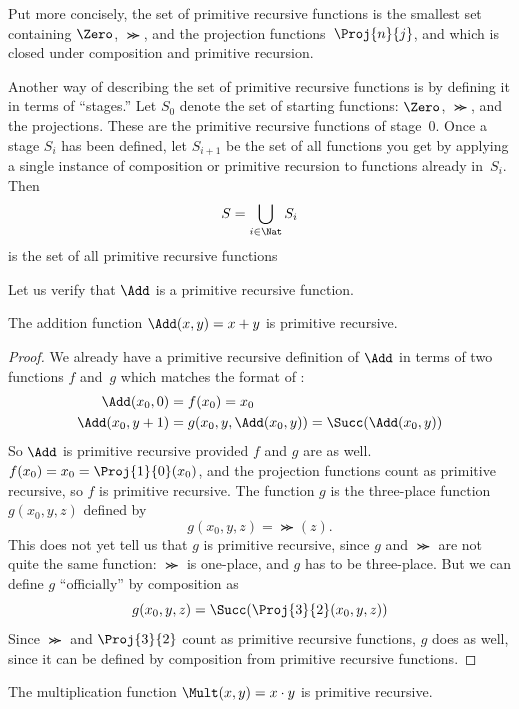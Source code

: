 \documentclass[../../../include/open-logic-section]{subfiles}
\begin{document}
\begin{explain}
Put more concisely, the set of primitive recursive functions is the
smallest set containing $\Zero$, $\Succ$, and the projection
functions~$\Proj{n}{j}$, and which is closed under composition and
primitive recursion.

Another way of describing the set of primitive recursive functions is
by defining it in terms of ``stages.'' Let $S_0$ denote the set of
starting functions: $\Zero$, $\Succ$, and the projections. These are
the primitive recursive functions of stage~$0$. Once a stage $S_i$ has
been defined, let $S_{i+1}$ be the set of all functions you get by
applying a single instance of composition or primitive recursion to
functions already in~$S_i$. Then
\[
S = \bigcup_{i \in \Nat} S_i
\]
is the set of all primitive recursive functions
\end{explain}

Let us verify that $\Add$ is a primitive recursive function.

\begin{prop}
  The addition function $\Add(x,y) = x+y$ is primitive recursive.
\end{prop}

\begin{proof}
We already have a primitive recursive definition of $\Add$ in terms of
two functions $f$ and~$g$ which matches the format of
:
\begin{align*}
  \Add(x_0, 0) & = f(x_0) = x_0\\
  \Add(x_0, y+1) & = g(x_0, y, \Add(x_0, y)) =
  \Succ(\Add(x_0, y))
\end{align*}
So $\Add$ is primitive recursive provided $f$ and $g$ are as
well. $f(x_0) = x_0 = \Proj{1}{0}(x_0)$, and the projection functions
count as primitive recursive, so $f$ is primitive recursive. The
function $g$ is the three-place function $g(x_0, y, z)$ defined by
\[
g(x_0, y, z) = \Succ(z).
\]
This does not yet tell us that $g$ is primitive recursive, since $g$
and $\Succ$ are not quite the same function: $\Succ$ is one-place, and
$g$ has to be three-place. But we can define $g$ ``officially'' by
composition as
\[
g(x_0, y, z) = \Succ(\Proj{3}{2}(x_0, y, z))
\]
Since $\Succ$ and $\Proj{3}{2}$ count as primitive recursive
functions, $g$ does as well, since it can be defined by composition
from primitive recursive functions.
\end{proof}

\begin{prop}
  The multiplication function $\Mult(x,y) = x \cdot y$ is primitive recursive.
\end{prop}
\end{document}

